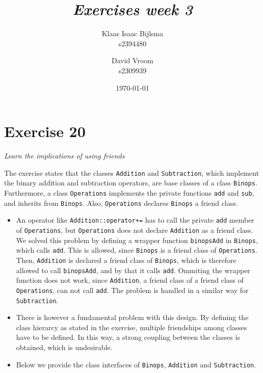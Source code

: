 \documentclass[12pt]{article}
\title{\itshape Exercises week 3}
\author{
	Klaas Isaac Bijlsma \\ s2394480
	\and
	David Vroom \\ s2309939
}
\date{\today}
\newcommand{\desc}[1]{\textit{#1} \vspace{1em}}
\begin{document}
\maketitle

\section*{Exercise 20}
\desc{Learn the implications of using friends}

The exercise states that the classes \texttt{Addition} and \texttt{Subtraction}, which implement the binary addition and subtraction operators, are base classes of a class \texttt{Binops}. Furthermore, a class \texttt{Operations} implements the private functions \texttt{add} and \texttt{sub}, and inherits from \texttt{Binops}. Also, \texttt{Operations} declares \texttt{Binops} a friend class. 

\begin{itemize}
	\item
	An operator like \texttt{Addition::operator+=} has to call the private \texttt{add} member of \texttt{Operations}, but \texttt{Operations} does not declare \texttt{Addition} as a friend class. \\
	We solved this problem by defining a wrapper function \texttt{binopsAdd} in \texttt{Binops}, which calls \texttt{add}. This is allowed, since \texttt{Binops} is a friend class of \texttt{Operations}. Then, \texttt{Addition} is declared a friend class of \texttt{Binops}, which is therefore allowed to call \texttt{binopsAdd}, and by that it calls \texttt{add}. Ommiting the wrapper function does not work, since \texttt{Addition}, a friend class of a friend class of \texttt{Operations}, can not call \texttt{add}. The problem is handled in a similar way for \texttt{Subtraction}.  
	\item
	There is however a fundamental problem with this design. By defining the class hierarcy as stated in the exercise, multiple friendships among classes have to be defined. In this way, a strong coupling between the classes is obtained, which is undesirable. 

	\begin{comment}
	In fact, the class hierarchy should be the other way around, such that \texttt{Operations} is the base class defining the private \texttt{add} and \texttt{sub} functions, from which \texttt{Binops} inherits. \texttt{Addition} and \texttt{Subtraction} then inherit from \texttt{Binops}. In this way, no friend declarations causing extra coupling have to be defined. 
	\end{comment}
	\item
	Below we provide the class interfaces of \texttt{Binops}, \texttt{Addition} and \texttt{Subtraction}.
\end{itemize}
\end{document}
